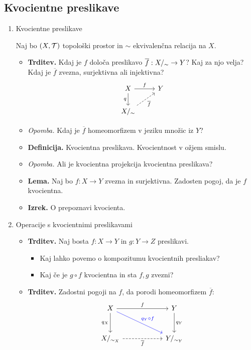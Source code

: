 \subsection{Kvocientne preslikave}
\begin{enumerate}
    \item Kvocientne preslikave
    
    Naj bo \((X, \mathcal{T})\) topološki prostor in \(\sim\) ekvivalenčna relacija na \(X\).
    \begin{itemize}
        \item \colorbox{blue!30}{\textbf{Trditev.}} Kdaj je \(f\) določa preslikavo \(\overline{f}: {X/_\sim} \to Y\)? Kaj za njo velja? Kdaj je \(\overline{f}\) zvezna, surjektivna ali injektivna?
        \[
            \begin{tikzcd}
                X \arrow{r}{f} \arrow[swap]{d}{q} & Y \\
                \qs{X} \arrow[dashed, swap]{ru}{\overline{f}}
            \end{tikzcd}
        \]
        \item \colorbox{yellow!30}{\emph{Opomba.}} Kdaj je \(\overline{f}\) homeomorfizem v jeziku množic iz \(Y\)?
        \item \colorbox{purple!30}{\textbf{Definicija.}} Kvocientna preslikava. Kvocientnost v ožjem smislu. 
        \item \colorbox{yellow!30}{\emph{Opomba.}} Ali je kvocientna projekcija kvocientna preslikava?
        \item \colorbox{blue!30}{\textbf{Lema.}} Naj bo \(f: X \to Y\) zvezna in surjektivna. Zadosten pogoj, da je \(f\) kvocientna.
        \item \colorbox{blue!30}{\textbf{Izrek.}} O prepoznavi kvocienta.
    \end{itemize}
    \item Operacije s kvocientnimi preslikavami
    \begin{itemize}
        \item \colorbox{blue!30}{\textbf{Trditev.}} Naj bosta \(f: X \to Y\) in \(g: Y \to Z\) preslikavi.
        \begin{itemize}
            \item Kaj lahko povemo o kompozitumu kvocientnih presliakav?
            \item Kaj če je \(g \circ f\) kvocientna in sta \(f, g\) zvezni?
        \end{itemize}
        \item \colorbox{blue!30}{\textbf{Trditev.}} Zadostni pogoji na \(f\), da porodi homeomorfizem \(\overline{f}\):
            \[
                \begin{tikzcd}[column sep=2cm, row sep=1cm]
                    X \arrow{r}{f} \arrow[swap]{d}{q_X} \arrow[draw=blue]{rd}{\textcolor{blue}{q_Y \circ f}} & Y \arrow{d}{q_Y} \\
                    X/_{\sim_X} \arrow[dashed, swap]{r}{\overline{f}} & Y/_{\sim_Y}
                \end{tikzcd}
            \]
    \end{itemize}
\end{enumerate}


